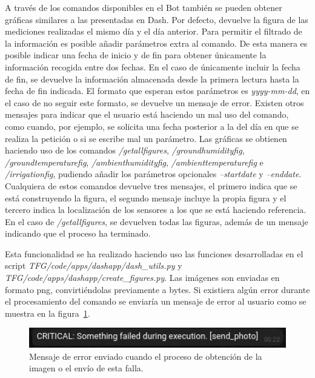 \documentclass[a4paper, 12pt, oneside]{book}
\begin{document}
A través de los comandos disponibles en el Bot también se pueden obtener gráficas similares a las presentadas en Dash. Por defecto, devuelve la figura de las mediciones realizadas el mismo día y el día anterior. Para permitir el filtrado de la información es posible añadir parámetros extra al comando. De esta manera es posible indicar una fecha de inicio y de fin para obtener únicamente la información recogida entre dos fechas. En el caso de únicamente incluir la fecha de fin, se devuelve la información almacenada desde la primera lectura hasta la fecha de fin indicada. El formato que esperan estos parámetros es \textit{yyyy-mm-dd}, en el caso de no seguir este formato, se devuelve un mensaje de error.
Existen otros mensajes para indicar que el usuario está haciendo un mal uso del comando, como cuando, por ejemplo, se solicita una fecha posterior a la del día en que se realiza la petición o si se escribe mal un parámetro.
Las gráficas se obtienen haciendo uso de los comandos \textit{/getallfigures}, \textit{/groundhumidityfig}, \textit{/groundtemperaturefig}, \textit{/ambienthumidityfig}, \textit{/ambienttemperaturefig} e \textit{/irrigationfig}, pudiendo añadir los parámetros opcionales \textit{--startdate} y \textit{--enddate}. Cualquiera de estos comandos devuelve tres mensajes, el primero indica que se está construyendo la figura, el segundo mensaje incluye la propia figura y el tercero indica la localización de los sensores a los que se está haciendo referencia. En el caso de \textit{/getallfigures}, se devuelven todas las figuras, además de un mensaje indicando que el proceso ha terminado.

Esta funcionalidad se ha realizado haciendo uso las funciones desarrolladas en el script \textit{TFG/code/apps/dashapp/dash\_utils.py} y \textit{TFG/code/apps/dashapp/create\_figures.py}. Las imágenes son enviadas en formato png, convirtiéndolas previamente a bytes. Si existiera algún error durante el procesamiento del comando se enviaría un mensaje de error al usuario como se muestra en la figura~\ref{figura:error send photo}.
\begin{figure}[H]
	\centering
    \includegraphics[width=12cm, keepaspectratio]{img/error_send_photo}
    \caption{Mensaje de error enviado cuando el proceso de obtención de la imagen o el envío de esta falla.}
    \label{figura:error send photo}
\end{figure}
\end{document}
